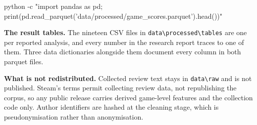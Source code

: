\begin{cmd}
python -c "import pandas as pd; print(pd.read_parquet('data/processed/game_scores.parquet').head())"
\end{cmd}

\textbf{The result tables.} The nineteen CSV files in
\texttt{data\textbackslash processed\textbackslash tables} are one per reported analysis, and every
number in the research report traces to one of them. Three data dictionaries alongside them
document every column in both parquet files.

\textbf{What is not redistributed.} Collected review text stays in \texttt{data\textbackslash raw}
and is not published. Steam's terms permit collecting review data, not republishing the corpus, so
any public release carries derived game-level features and the collection code only. Author
identifiers are hashed at the cleaning stage, which is pseudonymisation rather than anonymisation.
